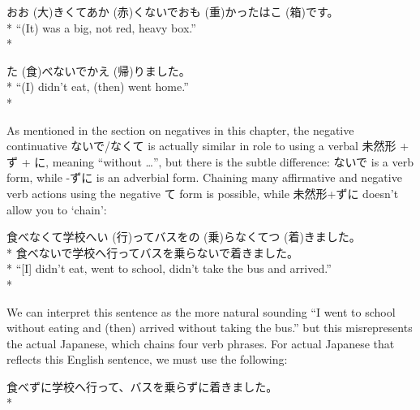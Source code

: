\documentclass[11pt, b5paper, twoside, openright, onecolumn]{book}
\makeatletter
\newcommand*{\rubystack}[2]{{\relscale{0.5}%
  \begin{tabular}[b]{@{}c@{}}%
    {#1}\\%
   {\textscale{2}{#2}}%
  \end{tabular}}%
}
\DeclareRobustCommand*{\ruby}[2]{%
  \mbox{%
    \setlength{\parskip}{0ex}%
    \BeginAccSupp{method=pdfstringdef,ActualText={#1}}%
      \rubystack{\phantom{#2}}{#1}%
      \llap{%
        \rubystack{#2}{\phantom{#1}}%
      }%
    \EndAccSupp{}%
  }%
}
\renewcommand*{\ruby}[2]{#2 (#1)}%
\newenvironment{exampleblock}{
\setlength{\parindent}{0.6in}
\begin{minipage}[t]{\dimexpr\textwidth-\parindent}}
{\end{minipage}}
\makeatother
\begin{document}
\vspace{0.4cm}
\begin{exampleblock}
\ruby{大}{おお}きくて\ruby{赤}{あか}くないで\ruby{重}{おも}かった\ruby{箱}{はこ}です。 \\* 
“(It) was a big‚ not red‚ heavy box.” \\* 
\end{exampleblock}
\vspace{0.2cm}

\begin{exampleblock}
\ruby{食}{た}べないで\ruby{帰}{かえ}りました。 \\* 
“(I) didn’t eat‚ (then) went home.” \\* 
\end{exampleblock}
\vspace{0.2cm}

As mentioned in the section on negatives in this chapter‚ the negative continuative ないで/なくて is actually similar in role to using a verbal 未然形 + ず + に‚ meaning “without …”‚ but there is the subtle difference: ないで is a verb form‚ while -ずに is an adverbial form. Chaining many affirmative and negative verb actions using the negative て form is possible‚ while 未然形+ずに doesn’t allow you to ‘chain’:

\vspace{0.4cm}
\begin{exampleblock}
食べなくて学校へ\ruby{行}{い}ってバスを\ruby{乗}{の}らなくて\ruby{着}{つ}きました。 \\* 
食べないで学校へ行ってバスを乗らないで着きました。 \\* 
“[I] didn’t eat‚ went to school‚ didn’t take the bus and arrived.” \\* 
\end{exampleblock}
\vspace{0.2cm}

We can interpret this sentence as the more natural sounding “I went to school without eating and (then) arrived without taking the bus.” but this misrepresents the actual Japanese‚ which chains four verb phrases. For actual Japanese that reflects this English sentence‚ we must use the following:

\vspace{0.4cm}
\begin{exampleblock}
食べずに学校へ行って、バスを乗らずに着きました。 \\* 
\end{exampleblock}
\vspace{0.2cm}
\end{document}
